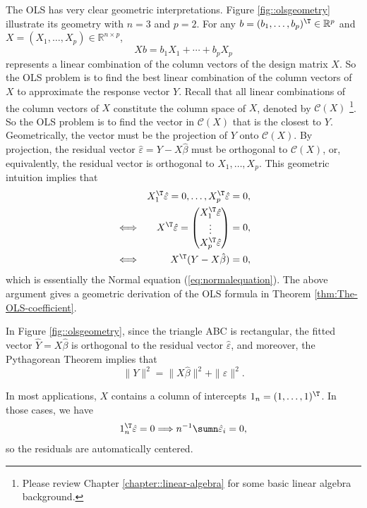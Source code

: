 The OLS has very clear geometric interpretations. Figure \ref{fig::olsgeometry} illustrate its geometry with $n=3$ and $p=2$. 
For any $b=(b_{1},\ldots,b_{p})^{\T}\in\mathbb{R}^{p}$ and $X=(X_{1},\ldots,X_{p})\in\mathbb{R}^{n\times p}$,
$$
Xb=b_{1}X_{1}+\cdots+b_{p}X_{p}
$$ 
represents a linear combination
of the column vectors of the design matrix $X$. So the OLS problem
is to find the best linear combination of the column vectors of $X$
to approximate the response vector $Y$. Recall that all linear combinations
of the column vectors of $X$ constitute the column space of $X$,
denoted by $\mathcal{C}(X)$ \footnote{Please review Chapter \ref{chapter::linear-algebra} for some basic linear algebra background.}. So the OLS problem is to find the vector
in $\mathcal{C}(X)$ that is the closest to $Y$. Geometrically, the vector
must be the projection of $Y$ onto $\mathcal{C}(X).$ By projection,
the residual vector $\hat{\varepsilon}=Y-X\hat{\beta}$ must be orthogonal
to $\mathcal{C}(X)$, or, equivalently, the residual
vector is orthogonal to $X_{1},\ldots,X_{p}$. This geometric intuition
 implies that
\begin{eqnarray*}
&&X_{1}^{\T} \hat{\varepsilon} =0,\ldots,X_{p}^{\T}  \hat{\varepsilon} =0 , \\
&  \Longleftrightarrow &  X^{\T} \hat{\varepsilon}
= \begin{pmatrix}
X_1^{\T} \hat{\varepsilon} \\
\vdots \\
X_p^{\T}\hat{\varepsilon}
\end{pmatrix}
=0,\\
 &  \Longleftrightarrow & X^{\T} (Y-X\hat{\beta}) = 0 ,
\end{eqnarray*}
which is essentially the Normal equation (\ref{eq:normalequation}). 
The above argument gives a geometric derivation of the OLS formula
in Theorem \ref{thm:The-OLS-coefficient}. 



In Figure \ref{fig::olsgeometry}, since the triangle ABC is rectangular, the fitted vector $\hat{Y} = X\hat{\beta}$ is orthogonal to the residual vector $\hat{\varepsilon}$, and moreover, the Pythagorean Theorem implies that
$$
\| Y\|^2 = \| X\hat{\beta} \|^2 + \| \hat{\varepsilon} \|^2.
$$


In most applications,  $X$ contains a column of intercepts $1_{n}=(1,\ldots,1)^{\T}$. In those cases, we have
\[
1_{n}^{\T}\hat{\varepsilon}=0\Longrightarrow n^{-1}\sumn\hat{\varepsilon}_{i}=0,
\]
 so the residuals are automatically centered. 



